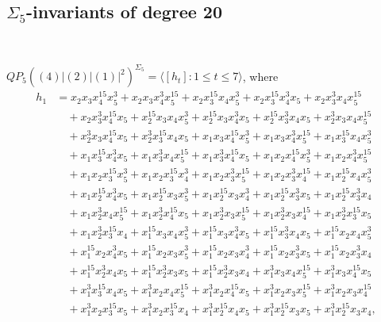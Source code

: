 \documentclass[reqno]{amsart}
\theoremstyle{plain}
\theoremstyle{definition}
\theoremstyle{plain}
\theoremstyle{definition}
\numberwithin{equation}{section}
\begin{document}
\subsection{$\Sigma_5$-invariants of degree 20}\label{s52}\

\medskip
$QP_5((4)|(2)|(1)|^2)^{\Sigma_5} = \langle [h_t] : 1 \leqslant t \leqslant 7 \rangle$, where
\begin{align*}
h_1 &= x_2x_3x_4^{15}x_5^{3} + x_2x_3x_4^{3}x_5^{15} + x_2x_3^{15}x_4x_5^{3} + x_2x_3^{15}x_4^{3}x_5 + x_2x_3^{3}x_4x_5^{15}\\ &\quad + x_2x_3^{3}x_4^{15}x_5 + x_2^{15}x_3x_4x_5^{3} + x_2^{15}x_3x_4^{3}x_5 + x_2^{15}x_3^{3}x_4x_5 + x_2^{3}x_3x_4x_5^{15}\\ &\quad + x_2^{3}x_3x_4^{15}x_5 + x_2^{3}x_3^{15}x_4x_5 + x_1x_3x_4^{15}x_5^{3} + x_1x_3x_4^{3}x_5^{15} + x_1x_3^{15}x_4x_5^{3}\\ &\quad + x_1x_3^{15}x_4^{3}x_5 + x_1x_3^{3}x_4x_5^{15} + x_1x_3^{3}x_4^{15}x_5 + x_1x_2x_4^{15}x_5^{3} + x_1x_2x_4^{3}x_5^{15}\\ &\quad + x_1x_2x_3^{15}x_5^{3} + x_1x_2x_3^{15}x_4^{3} + x_1x_2x_3^{3}x_5^{15} + x_1x_2x_3^{3}x_4^{15} + x_1x_2^{15}x_4x_5^{3}\\ &\quad + x_1x_2^{15}x_4^{3}x_5 + x_1x_2^{15}x_3x_5^{3} + x_1x_2^{15}x_3x_4^{3} + x_1x_2^{15}x_3^{3}x_5 + x_1x_2^{15}x_3^{3}x_4\\ &\quad + x_1x_2^{3}x_4x_5^{15} + x_1x_2^{3}x_4^{15}x_5 + x_1x_2^{3}x_3x_5^{15} + x_1x_2^{3}x_3x_4^{15} + x_1x_2^{3}x_3^{15}x_5\\ &\quad + x_1x_2^{3}x_3^{15}x_4 + x_1^{15}x_3x_4x_5^{3} + x_1^{15}x_3x_4^{3}x_5 + x_1^{15}x_3^{3}x_4x_5 + x_1^{15}x_2x_4x_5^{3}\\ &\quad + x_1^{15}x_2x_4^{3}x_5 + x_1^{15}x_2x_3x_5^{3} + x_1^{15}x_2x_3x_4^{3} + x_1^{15}x_2x_3^{3}x_5 + x_1^{15}x_2x_3^{3}x_4\\ &\quad + x_1^{15}x_2^{3}x_4x_5 + x_1^{15}x_2^{3}x_3x_5 + x_1^{15}x_2^{3}x_3x_4 + x_1^{3}x_3x_4x_5^{15} + x_1^{3}x_3x_4^{15}x_5\\ &\quad + x_1^{3}x_3^{15}x_4x_5 + x_1^{3}x_2x_4x_5^{15} + x_1^{3}x_2x_4^{15}x_5 + x_1^{3}x_2x_3x_5^{15} + x_1^{3}x_2x_3x_4^{15}\\ &\quad + x_1^{3}x_2x_3^{15}x_5 + x_1^{3}x_2x_3^{15}x_4 + x_1^{3}x_2^{15}x_4x_5 + x_1^{3}x_2^{15}x_3x_5 + x_1^{3}x_2^{15}x_3x_4,\\

\end{align*}
\end{document}
